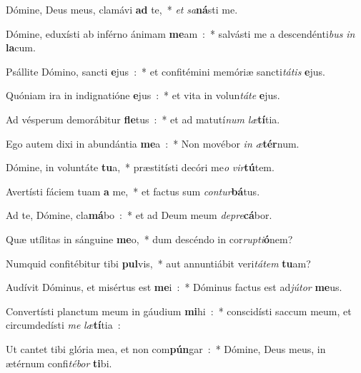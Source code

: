 ﻿\item Dómine, Deus meus, clamávi \textbf{ad} te,~* \emph{et} \emph{sa}\textbf{ná}sti me.
\item Dómine, eduxísti ab inférno ánimam \textbf{me}am~:~* salvásti me a descendénti\emph{bus} \emph{in} \textbf{la}cum.
\item Psállite Dómino, sancti \textbf{e}jus~:~* et confitémini memóriæ sancti\emph{tá}\emph{tis} \textbf{e}jus.
\item Quóniam ira in indignatióne \textbf{e}jus~:~* et vita in volun\emph{tá}\emph{te} \textbf{e}jus.
\item Ad vésperum demorábitur \textbf{fle}tus~:~* et ad matutí\emph{num} \emph{læ}\textbf{tí}tia.
\item Ego autem dixi in abundántia \textbf{me}a~:~* Non movébor \emph{in} \emph{æ}\textbf{tér}num.
\item Dómine, in voluntáte \textbf{tu}a,~* præstitísti decóri me\emph{o} \emph{vir}\textbf{tú}tem.
\item Avertísti fáciem tuam \textbf{a} me,~* et factus sum \emph{con}\emph{tur}\textbf{bá}tus.
\item Ad te, Dómine, cla\textbf{má}bo~:~* et ad Deum meum \emph{de}\emph{pre}\textbf{cá}bor.
\item Quæ utílitas in sánguine \textbf{me}o,~* dum descéndo in cor\emph{rup}\emph{ti}\textbf{ó}nem?
\item Numquid confitébitur tibi \textbf{pul}vis,~* aut annuntiábit veri\emph{tá}\emph{tem} \textbf{tu}am?
\item Audívit Dóminus, et misértus est \textbf{me}i~:~* Dóminus factus est ad\emph{jú}\emph{tor} \textbf{me}us.
\item Convertísti planctum meum in gáudium \textbf{mi}hi~:~* conscidísti saccum meum, et circumdedísti \emph{me} \emph{læ}\textbf{tí}tia~:
\item Ut cantet tibi glória mea, et non com\textbf{pún}gar~:~* Dómine, Deus meus, in ætérnum confi\emph{té}\emph{bor} \textbf{ti}bi.